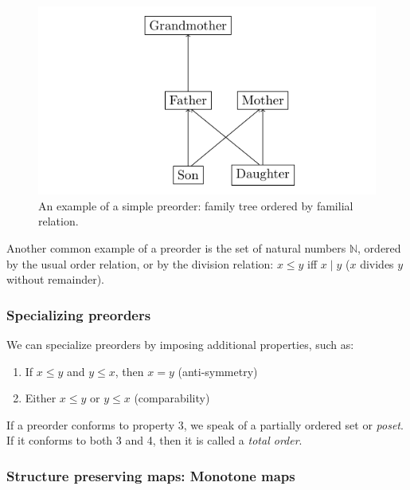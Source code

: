 \documentclass[
]{book}
\providecommand{\tightlist}{%
  \setlength{\itemsep}{0pt}\setlength{\parskip}{0pt}}
\theoremstyle{definition}
\theoremstyle{definition}
\theoremstyle{definition}
\theoremstyle{definition}
\theoremstyle{remark}
\begin{document}
\begin{figure}

{\centering \includegraphics[width=1\linewidth,height=1\textheight]{./figures/family-tree} 

}

\caption{An example of a simple preorder: family tree ordered by familial relation.}\label{fig:family-tree}
\end{figure}

Another common example of a preorder is the set of natural numbers \(\mathbb{N}\), ordered by the usual order relation, or by the division relation: \(x \leq y\) iff \(x \mid y\) (\(x\) divides \(y\) without remainder).

\subsubsection{Specializing preorders}\label{specializing-preorders}

We can specialize preorders by imposing additional properties, such as:

\begin{enumerate}
\def\labelenumi{\arabic{enumi}.}
\setcounter{enumi}{2}
\tightlist
\item
  If \(x \leq y\) and \(y \leq x\), then \(x = y\) (anti-symmetry)
\item
  Either \(x \leq y\) or \(y \leq x\) (comparability)
\end{enumerate}

If a preorder conforms to property 3, we speak of a partially ordered set or \emph{poset}. If it conforms to both 3 and 4, then it is called a \emph{total order}.

\subsubsection{Structure preserving maps: Monotone maps}\label{structure-preserving-maps-monotone-maps}
\end{document}
